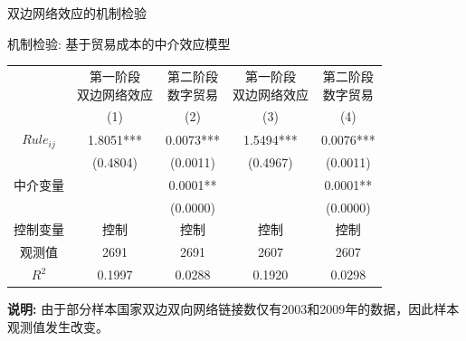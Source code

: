 \documentclass{beamer}
\begin{document}
\begin{frame}{双边网络效应的机制检验}
    \vspace{-0.3cm}
    \centering
    \small
    \begin{threeparttable}
        \captionsetup{font=small}
        \caption{机制检验: 基于贸易成本的中介效应模型}
        \begin{tabular}{ccccc}
            \toprule
            & \makecell[c]{第一阶段 \\ 双边网络效应} & \makecell[c]{第二阶段 \\ 数字贸易} & \makecell[c]{第一阶段 \\ 双边网络效应} & \makecell[c]{第二阶段 \\ 数字贸易} \\
            & (1) & (2) & (3) & (4) \\
            \midrule
            $Rule_{ij}$ & 1.8051*** & 0.0073*** & 1.5494*** & 0.0076*** \\
             & (0.4804) & (0.0011) & (0.4967) & (0.0011) \\
            中介变量 & & 0.0001** & & 0.0001** \\
             & & (0.0000) & & (0.0000) \\
            控制变量 & 控制 & 控制 & 控制 & 控制 \\
            观测值 & 2691 & 2691 & 2607 & 2607 \\
            $R^2$ & 0.1997 & 0.0288 & 0.1920 & 0.0298 \\
            \bottomrule
        \end{tabular}
        \begin{tablenotes}
            \item \textbf{说明:} 由于部分样本国家双边双向网络链接数仅有2003和2009年的数据，因此样本观测值发生改变。
        \end{tablenotes}
    \end{threeparttable}
\end{frame}
\end{document}
